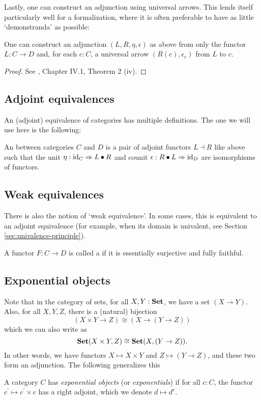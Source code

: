 Lastly, one can construct an adjunction using universal arrows. This lends itself particularly well for a formalization, where it is often preferable to have as little `demonstranda' as possible:
\begin{lemma}
  One can construct an adjunction $ (L, R, \eta, \epsilon) $ as above from only the functor $ L: C \to D $ and, for each $ c: C $, a universal arrow $ (R(c), \epsilon_c) $ from $ L $ to $ c $.
\end{lemma}
\begin{proof}
  See \autocite{MacLane}, Chapter IV.1, Theorem 2 (iv).
\end{proof}

\subsection{Adjoint equivalences}
An (adjoint) equivalence of categories has multiple definitions. The one we will use here is the following:

\begin{definition}\label{def:equivalence-of-categories}
  An  between categories $ C $ and $ D $ is a pair of adjoint functors $ L \dashv R $ like above such that the unit $ \eta: \text{id}_{C} \Rightarrow L \bullet R $ and counit $ \epsilon: R \bullet L \Rightarrow \text{id}_{D} $ are isomorphisms of functors.
\end{definition}

\subsection{Weak equivalences}
There is also the notion of `weak equivalence'. In some cases, this is equivalent to an adjoint equivalence (for example, when its domain is univalent, see Section \ref{sec:univalence-principle}).
\begin{definition}
  A functor $ F: C \to D $ is called a  if it is essentially surjective and fully faithful.
\end{definition}

\subsection{Exponential objects}
Note that in the category of sets, for all $ X, Y: \mathbf{Set} $, we have a set $ (X \to Y) $. Also, for all $ X, Y, Z $, there is a (natural) bijection
\[ (X \times Y \to Z) \cong (X \to (Y \to Z)) \]
which we can also write as
\[ \mathbf{Set}(X \times Y, Z) \cong \mathbf{Set}(X, (Y \to Z)). \]
In other words, we have functors $ X \mapsto X \times Y $ and $ Z \mapsto (Y \to Z) $, and these two form an adjunction. The following generalizes this
\begin{definition}
  A category $ C $ has \textit{exponential objects} (or \textit{exponentials}) if for all $ c: C $, the functor $ c^\prime \mapsto c^\prime \times c $ has a right adjoint, which we denote $ d \mapsto d^c $.
\end{definition}

